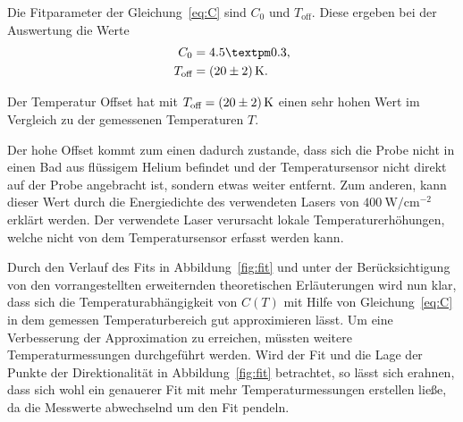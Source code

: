 Die Fitparameter der Gleichung~\ref{eq:C} sind $C_0$ und $T_\text{off}$.
Diese ergeben bei der Auswertung die Werte 
\begin{align}
    C_0 & = 4.5 ± 0.3, \\
    T_\text{off} & = \SI{ 20 \pm 2}{\kelvin}.
\end{align}

Der Temperatur Offset hat mit $T_\text{off} = \SI{ 20 \pm 2}{\kelvin}$ einen sehr hohen Wert
im Vergleich zu der gemessenen Temperaturen $T$.

Der hohe Offset kommt zum einen dadurch zustande, dass sich die Probe nicht in
einen Bad aus flüssigem Helium befindet und der Temperatursensor nicht direkt
auf der Probe angebracht ist, sondern etwas weiter entfernt. 
Zum anderen, kann dieser Wert durch die Energiedichte des verwendeten Lasers von $\SI{400}{\watt\per\centi\meter^{-2}}$
erklärt werden.
Der verwendete Laser verursacht lokale Temperaturerhöhungen, welche nicht 
von dem Temperatursensor erfasst werden kann.

Durch den Verlauf des Fits in Abbildung~\ref{fig:fit} und unter der Berücksichtigung von den
vorrangestellten erweiternden theoretischen Erläuterungen wird nun klar, dass
sich die Temperaturabhängigkeit von $C(T)$ mit Hilfe von Gleichung~\ref{eq:C} in dem
gemessen Temperaturbereich gut approximieren lässt.
Um eine Verbesserung der Approximation zu erreichen, müssten weitere Temperaturmessungen 
durchgeführt werden. 
Wird der Fit und die Lage der Punkte der Direktionalität in Abbildung~\ref{fig:fit} betrachtet, so
lässt sich erahnen, dass sich wohl ein genauerer Fit mit mehr Temperaturmessungen erstellen ließe,
da die Messwerte abwechselnd um den Fit pendeln.